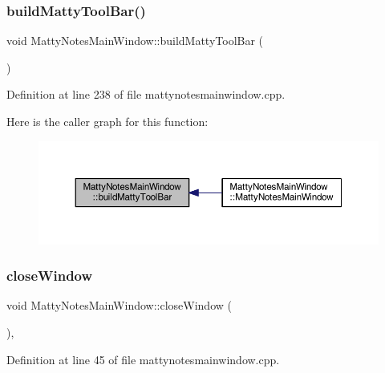 \subsubsection{\texorpdfstring{build\+Matty\+Tool\+Bar()}{buildMattyToolBar()}}
{\footnotesize\ttfamily void Matty\+Notes\+Main\+Window\+::build\+Matty\+Tool\+Bar (\begin{DoxyParamCaption}{ }\end{DoxyParamCaption})\hspace{0.3cm}{\ttfamily [private]}}



Definition at line 238 of file mattynotesmainwindow.\+cpp.

Here is the caller graph for this function\+:
\nopagebreak
\begin{figure}[H]
\begin{center}
\leavevmode
\includegraphics[width=350pt]{classMattyNotesMainWindow_a1ded942c8dec7b0443eef1c51a425af4_icgraph}
\end{center}
\end{figure}
\hypertarget{classMattyNotesMainWindow_ad4e9dfde3914909695d85c12e3d9894c}{}\label{classMattyNotesMainWindow_ad4e9dfde3914909695d85c12e3d9894c} 
\subsubsection{\texorpdfstring{close\+Window}{closeWindow}}
{\footnotesize\ttfamily void Matty\+Notes\+Main\+Window\+::close\+Window (\begin{DoxyParamCaption}{ }\end{DoxyParamCaption})\hspace{0.3cm}{\ttfamily [private]}, {\ttfamily [slot]}}



Definition at line 45 of file mattynotesmainwindow.\+cpp.

